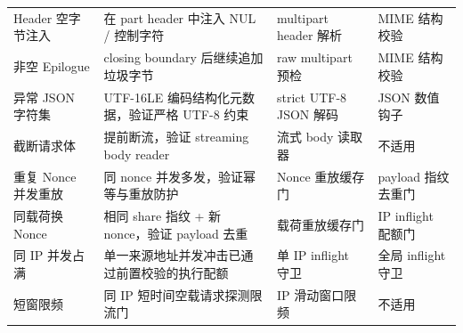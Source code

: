 \begin{longtable}{>{\raggedright\arraybackslash}p{}>{\raggedright\arraybackslash}p{}>{\raggedright\arraybackslash}p{}>{\raggedright\arraybackslash}p{}}
Header 空字节注入 & 在 part header 中注入 NUL / 控制字符 & multipart header 解析 & MIME 结构校验 \\
非空 Epilogue & closing boundary 后继续追加垃圾字节 & raw multipart 预检 & MIME 结构校验 \\
异常 JSON 字符集 & UTF-16LE 编码结构化元数据，验证严格 UTF-8 约束 & strict UTF-8 JSON 解码 & JSON 数值钩子 \\
截断请求体 & 提前断流，验证 streaming body reader & 流式 body 读取器 & 不适用 \\
重复 Nonce 并发重放 & 同 nonce 并发多发，验证幂等与重放防护 & Nonce 重放缓存门 & payload 指纹去重门 \\
同载荷换 Nonce & 相同 share 指纹 + 新 nonce，验证 payload 去重 & 载荷重放缓存门 & IP inflight 配额门 \\
同 IP 并发占满 & 单一来源地址并发冲击已通过前置校验的执行配额 & 单 IP inflight 守卫 & 全局 inflight 守卫 \\
短窗限频 & 同 IP 短时间空载请求探测限流门 & IP 滑动窗口限频 & 不适用 \\
\bottomrule
\end{longtable}

